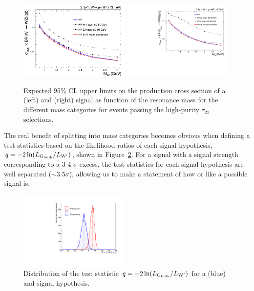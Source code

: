 \begin{figure}[h!p]
 \centering
 \includegraphics[width=0.49\textwidth]{figures/analysis/search1/AN-15-196/massCategories/compare-HP-HPV-Wprime.png}
  \includegraphics[width=0.49\textwidth]{figures/analysis/search1/AN-15-196/massCategories/compare-HP-HPV-BulkG.pdf}
 \caption{Expected 95\% CL upper limits on the production cross section of a \PWpr (left) and \BulkG (right) signal as function of the resonance mass for the different mass categories for events passing the high-purity $\tau_{21}$ selections.}
 \label{fig:searchI:massCategories}
 \end{figure}

The real benefit of splitting into mass categories becomes obvious when defining a test statistics based on the likelihood ratios of each signal hypothesis, $q = -2 \ln(L_{\mathrm{G}_\mathrm{bulk}}/L_{\mathrm{W}^\prime})$, shown in Figure~\ref{fig:searchI:signalsep}. For a signal with a signal strength corresponding to a 3-4 $\sigma$ excess, the test statistics for each signal hypothesis are well separated ($\sim3.5 \sigma$), allowing us to make a statement of how \BulkG or \PWpr like a possible signal is.

\begin{figure}[h!p]
 \centering
 \includegraphics[width=0.49\textwidth]{figures/analysis/search1/AN-15-196/massCategories/sig_sep.pdf}
 \caption{Distribution of the test statistic  $q = -2 \ln(L_{\mathrm{G}_\mathrm{bulk}}/L_{\mathrm{W}^\prime})$ for a \BulkG (blue) and \PWpr signal hypothesis.}
 \label{fig:searchI:signalsep}
 \end{figure}
 
